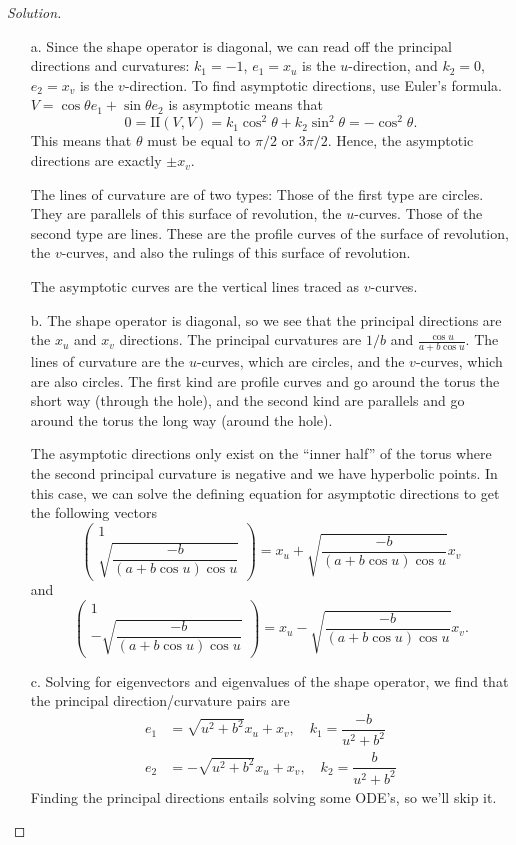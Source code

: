 \documentclass[Shifrin_Solutions_Spring_2018]{subfiles}
\begin{document}
\begin{proof}[Solution]
\begin{itemize}
\item[a.] Since the shape operator is diagonal, we can read off the principal directions and curvatures: $k_1 = -1$, $e_1 = x_u$ is the $u$-direction, and $k_2 = 0$, $e_2 = x_v$ is the $v$-direction. To find asymptotic directions, use Euler's formula. $V=\cos \theta e_1 + \sin\theta e_2$ is asymptotic means that
\[
0 = \mathrm{II}(V,V) = k_1 \cos^2 \theta + k_2 \sin^2 \theta = -\cos^2 \theta.
\]
This means that $\theta$ must be equal to $\pi/2$ or $3\pi/2$. Hence, the asymptotic directions are exactly $\pm x_v$.

The lines of curvature are of two types: Those of the first type are circles. They are parallels of this surface of revolution, the $u$-curves. Those of the second type are lines. These are the profile curves of the surface of revolution, the $v$-curves, and also the rulings of this surface of revolution.

The asymptotic curves are the vertical lines traced as $v$-curves.\\


\item[b.] The shape operator is diagonal, so we see that the principal directions are the $x_u$ and $x_v$ directions. The principal curvatures are $1/b$ and $\frac{\cos u}{a+b\cos u}$. The lines of curvature are the $u$-curves, which are circles, and the $v$-curves, which are also circles. The first kind are profile curves and go around the torus the short way (through the hole), and the second kind are parallels and go around the torus the long way (around the hole).

The asymptotic directions only exist on the ``inner half'' of the torus where the second principal curvature is negative and we have hyperbolic points. In this case, we can solve the defining equation for asymptotic directions to get the following vectors
\[
\begin{pmatrix} 1 \\ \sqrt{\dfrac{-b}{(a+b\cos u) \cos u}} \end{pmatrix} = x_u + \sqrt{\dfrac{-b}{(a+b\cos u) \cos u}} x_v
\]
and
\[
\begin{pmatrix} 1 \\ -\sqrt{\dfrac{-b}{(a+b\cos u) \cos u}}\end{pmatrix} = x_u -\sqrt{\dfrac{-b}{(a+b\cos u) \cos u}} x_v .
\]

\item[c.] Solving for eigenvectors and eigenvalues of the shape operator, we find that the principal direction/curvature pairs are
\begin{align*}
e_1 &= \sqrt{u^2+b^2} x_u + x_v, \quad k_1 = \dfrac{-b}{u^2+b^2} \\
e_2 &= -\sqrt{u^2+b^2} x_u + x_v, \quad k_2 = \dfrac{b}{u^2+b^2}
\end{align*}
Finding the principal directions entails solving some ODE's, so we'll skip it.


\end{itemize}
\end{proof}
\end{document}
